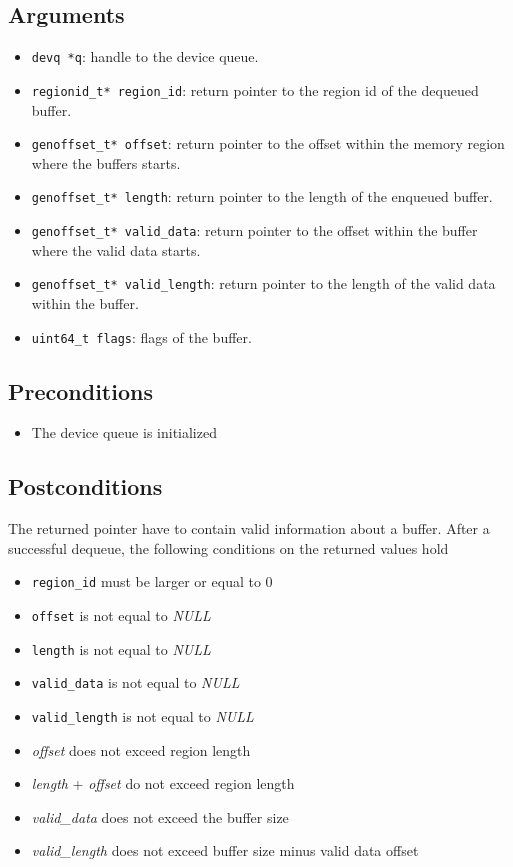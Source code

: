 \documentclass[a4paper,11pt,twoside]{report}
\begin{document}
	\subsection*{Arguments}
	\begin{itemize}
		\item \texttt{devq *q}: handle to the device queue.
		\item \texttt{regionid\_t* region\_id}: return pointer to the region id of the dequeued buffer.
		\item \texttt{genoffset\_t* offset}: return pointer to the offset within the memory region where the buffers starts. 
		\item \texttt{genoffset\_t* length}: return pointer to the length of the enqueued buffer.
		\item \texttt{genoffset\_t* valid\_data}: return pointer to the offset within the buffer where the valid data starts.
		\item \texttt{genoffset\_t* valid\_length}: return pointer to the length of the valid data within the buffer.
		\item \texttt{uint64\_t flags}: flags of the buffer. 
	\end{itemize}
	\subsection*{Preconditions}
	\begin{itemize}
		\item The device queue is initialized
	\end{itemize}
	\subsection*{Postconditions}
	The returned pointer have to contain valid information about a buffer.
	After a successful dequeue, the following conditions on the returned values hold
	\begin{itemize}
		\item \texttt{region\_id} must be larger or equal to 0
		\item \texttt{offset} is not equal to \textit{NULL}
		\item \texttt{length} is not equal to \textit{NULL}
		\item \texttt{valid\_data} is not equal to \textit{NULL}
		\item \texttt{valid\_length} is not equal to \textit{NULL}
		\item \textit{offset} does not exceed region length
		\item \textit{length} + \textit{offset} do not exceed region length
		\item \textit{valid\_data} does not exceed the buffer size
		\item \textit{valid\_length} does not exceed buffer size minus valid data offset
	\end{itemize}
	
\end{document}
